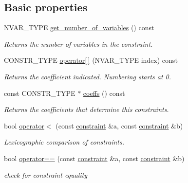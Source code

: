 \subsection*{Basic properties}
\begin{DoxyCompactItemize}
\item 
\mbox{\label{classconstraint_a62f9d6527236b92bce67ef3251ba1fae}} 
N\+V\+A\+R\+\_\+\+T\+Y\+PE \hyperlink{classconstraint_a62f9d6527236b92bce67ef3251ba1fae}{get\+\_\+number\+\_\+of\+\_\+variables} () const
\begin{DoxyCompactList}\small\item\em Returns the number of variables in the constraint. \end{DoxyCompactList}\item 
\mbox{\label{classconstraint_aab075ba7c8fa216eff36aeee8fc5552e}} 
C\+O\+N\+S\+T\+R\+\_\+\+T\+Y\+PE \hyperlink{classconstraint_aab075ba7c8fa216eff36aeee8fc5552e}{operator\mbox{[}$\,$\mbox{]}} (N\+V\+A\+R\+\_\+\+T\+Y\+PE index) const
\begin{DoxyCompactList}\small\item\em Returns the coefficient indicated. Numbering starts at 0. \end{DoxyCompactList}\item 
\mbox{\label{classconstraint_ac70165b34389dbe7e58d757e1f16bd8d}} 
const C\+O\+N\+S\+T\+R\+\_\+\+T\+Y\+PE $\ast$ \hyperlink{classconstraint_ac70165b34389dbe7e58d757e1f16bd8d}{coeffs} () const
\begin{DoxyCompactList}\small\item\em Returns the coefficients that determine this constraints. \end{DoxyCompactList}\item 
bool \hyperlink{classconstraint_aecc988c4f28198ecc105f60eddfbfddc}{operator$<$} (const \hyperlink{classconstraint}{constraint} \&a, const \hyperlink{classconstraint}{constraint} \&b)
\begin{DoxyCompactList}\small\item\em Lexicographic comparison of constraints. \end{DoxyCompactList}\item 
bool \hyperlink{classconstraint_acb6f7858d12f0c03f1c8be86ecbef902}{operator==} (const \hyperlink{classconstraint}{constraint} \&a, const \hyperlink{classconstraint}{constraint} \&b)
\begin{DoxyCompactList}\small\item\em check for constraint equality \end{DoxyCompactList}\item 

\end{DoxyCompactItemize}
